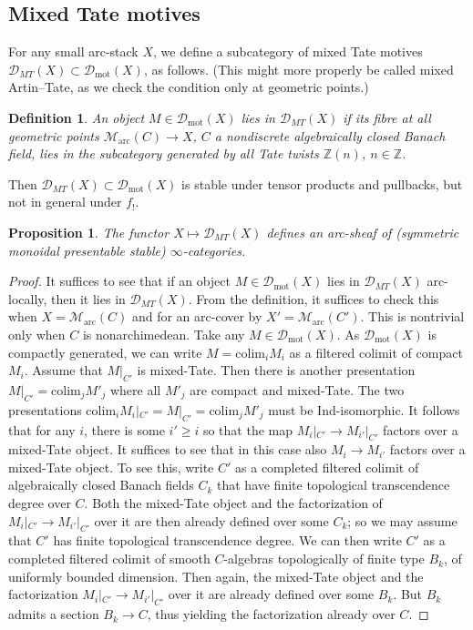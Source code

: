 \documentclass[11pt]{amsart}
\numberwithin{equation}{section}
\numberwithin{theorem}{section}
\newtheorem{proposition}[theorem]{Proposition}
\newtheorem{definition}[theorem]{Definition}
\theoremstyle{definition}
\begin{document}
\subsection{Mixed Tate motives} For any small arc-stack $X$, we define a subcategory of mixed Tate motives $\mathcal D_{MT}(X)\subset \mathcal D_{\mathrm{mot}}(X)$, as follows. (This might more properly be called mixed Artin--Tate, as we check the condition only at geometric points.)

\begin{definition} An object $M\in \mathcal D_{\mathrm{mot}}(X)$ lies in $\mathcal D_{MT}(X)$ if its fibre at all geometric points $\mathcal M_{\mathrm{arc}}(C)\to X$, $C$ a nondiscrete algebraically closed Banach field, lies in the subcategory generated by all Tate twists $\mathbb Z(n)$, $n\in \mathbb Z$.
\end{definition}

Then $\mathcal D_{MT}(X)\subset \mathcal D_{\mathrm{mot}}(X)$ is stable under tensor products and pullbacks, but not in general under $f_!$.

\begin{proposition} The functor $X\mapsto \mathcal D_{MT}(X)$ defines an arc-sheaf of (symmetric monoidal presentable stable) $\infty$-categories.
\end{proposition}

\begin{proof} It suffices to see that if an object $M\in \mathcal D_{\mathrm{mot}}(X)$ lies in $\mathcal D_{MT}(X)$ arc-locally, then it lies in $\mathcal D_{MT}(X)$. From the definition, it suffices to check this when $X=\mathcal M_{\mathrm{arc}}(C)$ and for an arc-cover by $X'=\mathcal M_{\mathrm{arc}}(C')$. This is nontrivial only when $C$ is nonarchimedean. Take any $M\in \mathcal D_{\mathrm{mot}}(X)$. As $\mathcal D_{\mathrm{mot}}(X)$ is compactly generated, we can write $M=\mathrm{colim}_i M_i$ as a filtered colimit of compact $M_i$. Assume that $M|_{C'}$ is mixed-Tate. Then there is another presentation $M|_{C'} = \mathrm{colim}_j M'_j$ where all $M'_j$ are compact and mixed-Tate. The two presentations $\mathrm{colim}_i M_i|_{C'} = M|_{C'} = \mathrm{colim}_j M'_j$ must be Ind-isomorphic. It follows that for any $i$, there is some $i'\geq i$ so that the map $M_i|_{C'}\to M_{i'}|_{C'}$ factors over a mixed-Tate object. It suffices to see that in this case also $M_i\to M_{i'}$ factors over a mixed-Tate object. To see this, write $C'$ as a completed filtered colimit of algebraically closed Banach fields $C_k$ that have finite topological transcendence degree over $C$. Both the mixed-Tate object and the factorization of $M_i|_{C'}\to M_{i'}|_{C'}$ over it are then already defined over some $C_k$; so we may assume that $C'$ has finite topological transcendence degree. We can then write $C'$ as a completed filtered colimit of smooth $C$-algebras topologically of finite type $B_k$, of uniformly bounded dimension. Then again, the mixed-Tate object and the factorization $M_i|_{C'}\to M_{i'}|_{C'}$ over it are already defined over some $B_k$. But $B_k$ admits a section $B_k\to C$, thus yielding the factorization already over $C$.
\end{proof}
\end{document}
